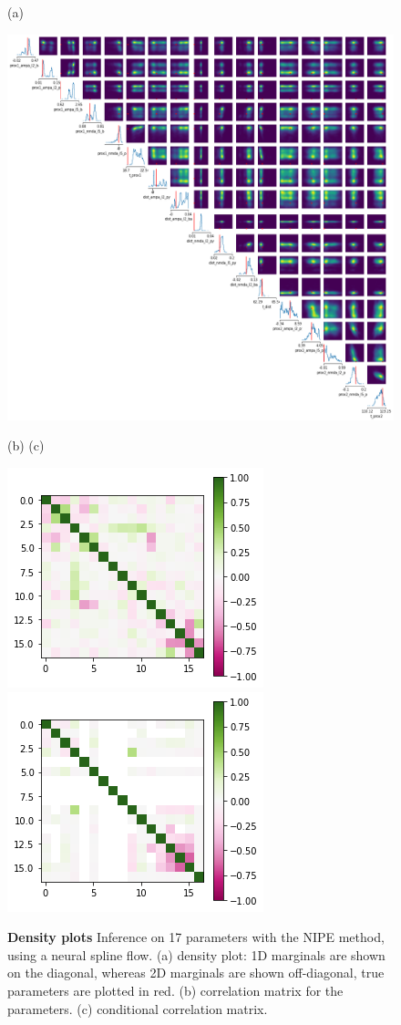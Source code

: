 \documentclass[12pt]{extreport}
\begin{document}
 \begin{figure}
 \centering


    \begin{minipage}{15cm}
        \small (a)  
    \end{minipage}
        \includegraphics[width=0.92\linewidth]{images/thesis_fig4_6a_nipe.png}
    \begin{minipage}{13cm}
        \small (b)  \hspace{6cm} \small (c)
    \end{minipage}  
        \includegraphics[width=0.37\linewidth]{images/thesis_fig4_6b_nipe.png}
        \includegraphics[width=0.37\linewidth]{images/thesis_fig4_6c_nipe.png}

        

\caption{\label{dens17nipe}\textbf{Density plots} \small Inference on 17 parameters with the NIPE method, using a neural spline flow. (a) density plot: 1D marginals are shown on the diagonal, whereas 2D marginals are shown off-diagonal, true parameters are plotted in red. (b) correlation matrix for the parameters. (c) conditional correlation matrix. }

\end{figure}
\end{document}
